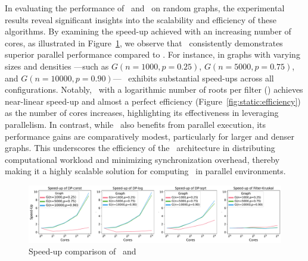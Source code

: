         In evaluating the performance of \DPmst\ and \FKruskal\ on random graphs, the experimental results reveal significant insights into the scalability and efficiency of these algorithms. By examining the speed-up achieved with an increasing number of cores, as illustrated in Figure~\ref{fig:static:speedup}, we observe that \DPmst\ consistently demonstrates superior parallel performance compared to \FKruskal. For instance, in graphs with varying sizes and densities —such as $G(n=1000,p=0.25)$,  $G(n=5000,p=0.75)$, and $G(n=10000,p=0.90)$— \DPmst\ exhibits substantial speed-ups across all configurations. Notably, \DPmst\ with a logarithmic number of roots per filter () achieves near-linear speed-up and almost a perfect efficiency (Figure~\ref{fig:static:efficiency}) as the number of cores increases, highlighting its effectiveness in leveraging parallelism. In contrast, while \FKruskal\ also benefits from parallel execution, its performance gains are comparatively modest, particularly for larger and denser graphs. This underscores the efficiency of the \DPmst\ architecture in distributing computational workload and minimizing synchronization overhead, thereby making it a highly scalable solution for computing \mst\ in parallel environments.
        
        \begin{figure}
            \centering
            \includegraphics[width=1\linewidth]{figures/SpeedUpDPandFK_sample.pdf}
            \caption{Speed-up comparison of \DPmst\ and \FKruskal}
            \label{fig:static:speedup}
        \end{figure}
        
